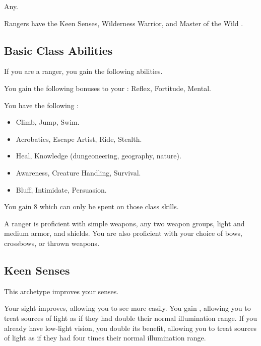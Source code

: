      Any.

     Rangers have the Keen Senses, Wilderness Warrior, and Master of the Wild .

    \subsection{Basic Class Abilities}
        If you are a ranger, you gain the following abilities.

        You gain the following bonuses to your :  Reflex,  Fortitude,  Mental.

        You have the following :
        \begin{itemize}
            \item {} Climb, Jump, Swim.
            \item {} Acrobatics, Escape Artist, Ride, Stealth.
            \item {} Heal, Knowledge (dungeoneering, geography, nature).
            \item {} Awareness, Creature Handling, Survival.
            \item {} Bluff, Intimidate, Persuasion.
        \end{itemize}
        You gain 8  which can only be spent on those class skills.

        A ranger is proficient with simple weapons, any two weapon groups, light and medium armor, and shields.
        You are also proficient with your choice of bows, crossbows, or thrown weapons.

    \subsection{Keen Senses}
        This archetype improves your senses.

        Your sight improves, allowing you to see more easily.
        You gain , allowing you to treat sources of light as if they had double their normal illumination range.
        If you already have low-light vision, you double its benefit, allowing you to treat sources of light as if they had four times their normal illumination range.

